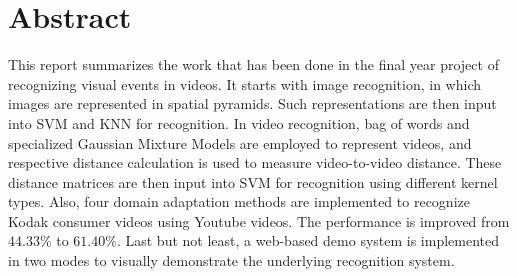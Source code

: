 \section*{Abstract}
This report summarizes the work that has been done in the final year project of recognizing visual events in videos. It starts with image recognition, in which images are represented in spatial pyramids. Such representations are then input into SVM and KNN for recognition. In video recognition, bag of words and specialized Gaussian Mixture Models are employed to represent videos, and respective distance calculation is used to measure video-to-video distance. These distance matrices are then input into SVM for recognition using different kernel types. Also, four domain adaptation methods are implemented to recognize Kodak consumer videos using Youtube videos. The performance is improved from $44.33\%$ to $61.40\%$. Last but not least, a web-based demo system is implemented in two modes to visually demonstrate the underlying recognition system.